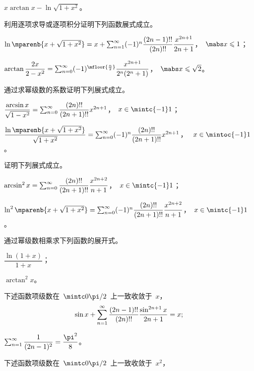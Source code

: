 \begin{exercise}
\begin{exlistcols}
  \item $x\arctan x-\ln\sqrt{1+x^2}$。
\end{exlistcols}
\item 利用逐项求导或逐项积分证明下列函数展式成立。
\begin{exlist}
  \item $\ln\mparenb{x+\sqrt{1+x^2}}=x+\sum_{n=1}^\sinf(-1)^n\dfrac{(2n-1)!!}{(2n)!!}\dfrac{x^{2n+1}}{2n+1}$，~$\mabs x\leq 1$；
  \item $\arctan\dfrac{2x}{2-x^2}=\sum_{n=0}^\sinf(-1)^{\mfloor{\frac n2}}\dfrac{x^{2n+1}}{2^n(2^n+1)}$，~$\mabs x\leq\sqrt 2$。
\end{exlist}
\item 通过求幂级数的系数证明下列展式成立。
\begin{exlist}
  \item $\dfrac{\arcsin x}{\sqrt{1-x^2}}=\sum_{n=0}^\infty\dfrac{(2n)!!}{(2n+1)!!}x^{2n+1}$，~$x\in\mintc{-1}1$；
  \item $\dfrac{\ln\mparenb{x+\sqrt{1+x^2}}}{\sqrt{1+x^2}}=\sum_{n=0}^\sinf(-1)^n\dfrac{(2n)!!}{(2n+1)!!}x^{2n+1}$，
  ~$x\in\mintoc{-1}1$。
\end{exlist}
\item 证明下列展式成立。
\begin{exlist}
  \item $\arcsin^2x=\sum_{n=0}^\infty\dfrac{(2n)!!}{(2n+1)!!}\dfrac{x^{2n+2}}{n+1}$，~$x\in\mintc{-1}1$；
  \item $\ln^2\mparenb{x+\sqrt{1+x^2}}=\sum_{n=0}^\sinf(-1)^n\dfrac{(2n)!!}{(2n+1)!!}\dfrac{x^{2n+2}}{n+1}$，~$x\in\mintc{-1}1$。
\end{exlist}
\item 通过幂级数相乘求下列函数的展开式。
\begin{exlistcols}
  \item $\dfrac{\ln(1+x)}{1+x}$；
  \item $\arctan^2x$。
\end{exlistcols}
\item\begin{exlist}\FixExHead
  \item 下述函数项级数在~$\mintc 0{\sfrac\pi2}$~上一致收敛于~$x$，
  \[
    \sin x+\sum_{n=1}^\infty\frac{(2n-1)!!}{(2n)!!}\frac{\sin^{2n+1}x}{2n+1}=x;
  \]
  \item $\sum_{n=1}^\sinf\dfrac1{(2n-1)^2}=\dfrac{\pi^2}8$。
\end{exlist}
\item\begin{exlist}\FixExHead
  \item 下述函数项级数在~$\mintc 0{\sfrac\pi2}$~上一致收敛于~$x^2$，

\end{exlist}
\end{exercise}
